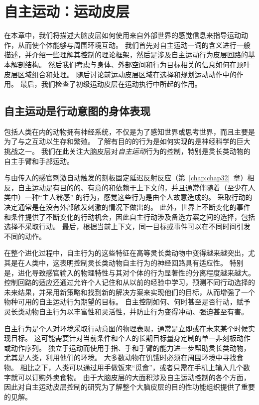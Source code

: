 \chapter{自主运动：运动皮层} \label{chap:chap34}




在本章中，我们将描述大脑皮层如何使用来自外部世界的感觉信息来指导运动动作，从而使个体能够与周围环境互动。
我们首先对自主运动一词的含义进行一般描述，并介绍一些理解其控制的理论框架，然后是涉及自主运动行为皮层回路的基本解剖结构。
然后我们考虑与身体、外部空间和行为目标相关的信息如何在顶叶皮层区域组合和处理。
随后讨论前运动皮层区域在选择和规划运动动作中的作用。
最后，我们检查了初级运动皮层在运动执行中所起的作用。



\section{自主运动是行动意图的身体表现}

包括人类在内的动物拥有神经系统，不仅是为了感知世界或思考世界，而且主要是为了与之互动以生存和繁殖。
了解有目的的行为是如何实现的是神经科学的巨大挑战之一。
我们在此关注大脑皮层对\textit{自主运动}行为的控制，特别是灵长类动物的自主手臂和手部运动。


与由传入的感官刺激自动触发的刻板固定延迟反射反应（第~\ref{chap:chap32}~章）相反，自主运动是有目的的、有意的和依赖于上下文的，并且通常伴随着（至少在人类中）一种“主人翁感” 的行为，感觉这些行为是由个人故意造成的。
采取行动的决定通常是在没有外部触发刺激的情况下做出的。
此外，世界上不断变化的事件和条件提供了不断变化的行动机会，因此自主行动涉及备选方案之间的选择，包括选择不采取行动。
最后，根据当前上下文，同一目标或事件可以在不同时间引发不同的动作。


在整个进化过程中，自主行为的这些特征在高等灵长类动物中变得越来越突出，尤其是在人类中，这表明控制灵长类动物自主行为的神经回路具有适应性。
特别是，进化导致感官输入的物理特性与其对个体的行为显著性的分离程度越来越大。
控制回路的适应还通过允许个人记住和从以前的经验中学习，预测不同行动选择的未来结果，并采用新策略和找到新的解决方案来实现他们的目标，从而增强了一个物种可用的自主运动行为期望的目标。
自主控制如何、何时甚至是否行动，赋予灵长类动物自主行为以丰富性和灵活性，并防止行为变得冲动、强迫甚至有害。


自主行为是个人对环境采取行动意图的物理表现，通常是立即或在未来某个时候实现目标。
这可能需要针对当前条件和个人的长期目标量身定制的单一非刻板动作或动作序列。
独立于运动而使用手指、手和手臂的能力进一步帮助灵长类动物，尤其是人类，利用他们的环境。
大多数动物在饥饿时必须在周围环境中寻找食物。
相比之下，人类可以通过用手做饭来“觅食”，或者只需在手机上输入几个数字就可以订购外卖食物。
由于大脑皮层的大面积涉及自主运动控制的各个方面，因此对自主运动皮层控制的研究为了解整个大脑皮层的目的性功能组织提供了重要的见解。



